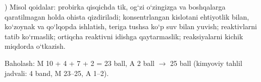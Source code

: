 \documentclass[11pt,a4paper]{article}
\begin{document}
) Misol qoidalar: probirka qisqichda tik, og`zi o`zingizga va boshqalarga qaratilmagan holda ohista qizdiriladi; konsentrlangan kislotani ehtiyotlik bilan, ko`zoynak va qo`lqopda ishlatish, teriga tushsa ko`p suv bilan yuvish; reaktivlarni tatib ko`rmaslik; ortiqcha reaktivni idishga qaytarmaslik; reaksiyalarni kichik miqdorda o`tkazish.\par
\noindent Baholash: M 10 + 4 + 7 + 2 = 23 ball, A 2 ball $\to$ 25 ball (kimyoviy tahlil jadvali: 4 band, M 23--25, A 1--2).\par
\end{document}
